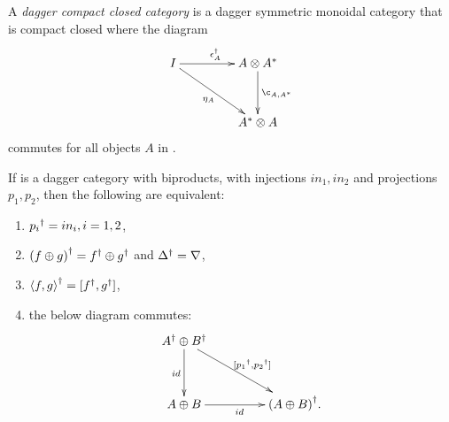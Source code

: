 \begin{definition}\label{def:daggercompact}
  A \emph{dagger compact closed category} \cD{} is a dagger symmetric monoidal category
  that is compact closed where the diagram
  \[
    \xymatrix @C+20pt @R+10pt{
      I \ar[r]^{\epsilon^{\dagger}_{A}} \ar[dr]_{\eta_{A}} &A\*A^{*}\ar[d]^{\c_{A,A^{*}}}\\
      &A^{*}\* A
    }
  \]
  commutes for all  objects $A$ in \cD.
\end{definition}

\begin{lemma}\label{lemma:daggerbiproducts}
If \cD{} is a dagger category with biproducts, with injections $in_{1},in_{2}$ and projections
$p_{1},p_{2}$, then the following are equivalent:
\begin{enumerate}
  \item ${p_{i}}^{\dagger} = in_{i}, i=1,2$, \label{ldpdgrpisq}
  \item ${(f\oplus g)}^{\dagger} = {f}^{\dagger}\oplus{g}^{\dagger}$ and ${\Delta}^{\dagger} = \nabla$,\label{ldpddeltisnab}
  \item ${\langle f,g\rangle}^{\dagger} = [{f}^{\dagger},{g}^{\dagger}]$,\label{ldpdcopisprod}
  \item the below diagram commutes:\label{ldpcommute}
  \[
    \xymatrix @C+20pt @R+10pt{
      \dgr{A} \+ \dgr{B} \ar[d]_{id} \ar[dr]^{[\dgr{p_{1}},\dgr{p_{2}}]}\\
      A\+B\ar[r]_{id}&\dgr{(A\+B)}.
    }
  \]
\end{enumerate}
\end{lemma}
